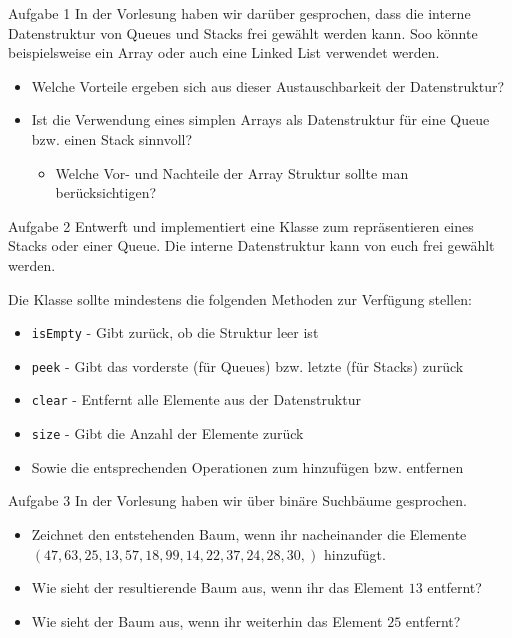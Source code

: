 \begin{frame}{Aufgabe 1}
In der Vorlesung haben wir darüber gesprochen, dass die interne Datenstruktur von Queues und Stacks frei gewählt werden kann. Soo könnte beispielsweise
ein Array oder auch eine Linked List verwendet werden.
	\begin{itemize}
		\item Welche Vorteile ergeben sich aus dieser Austauschbarkeit der Datenstruktur?
		\item Ist die Verwendung eines simplen Arrays als Datenstruktur für eine Queue bzw. einen Stack sinnvoll?
		\begin{itemize}
			\item Welche Vor- und Nachteile der Array Struktur sollte man berücksichtigen?
		\end{itemize}
	\end{itemize}
\end{frame}

\begin{frame}{Aufgabe 2}
Entwerft und implementiert eine Klasse zum repräsentieren eines Stacks oder einer Queue. Die interne Datenstruktur kann von euch frei gewählt werden.

Die Klasse sollte mindestens die folgenden Methoden zur Verfügung stellen:
\begin{itemize}
	\item \texttt{isEmpty} - Gibt zurück, ob die Struktur leer ist
	\item \texttt{peek} - Gibt das vorderste (für Queues) bzw. letzte (für Stacks) zurück
	\item \texttt{clear} - Entfernt alle Elemente aus der Datenstruktur
	\item \texttt{size} - Gibt die Anzahl der Elemente zurück
	\item Sowie die entsprechenden Operationen zum hinzufügen bzw. entfernen
\end{itemize}
\end{frame}

\begin{frame}{Aufgabe 3}
In der Vorlesung haben wir über binäre Suchbäume gesprochen. 
	\begin{itemize}
		\item Zeichnet den entstehenden Baum, wenn ihr nacheinander die Elemente $(47, 63, 25, 13, 57, 18, 99, 14, 22, 37, 24, 28, 30,)$ hinzufügt.
		\item Wie sieht der resultierende Baum aus, wenn ihr das Element $13$ entfernt?
		\item Wie sieht der Baum aus, wenn ihr weiterhin das Element $25$ entfernt?
	\end{itemize}
\end{frame}

